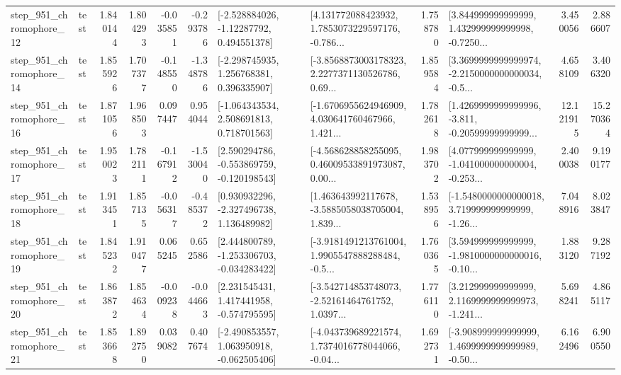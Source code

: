 \begin{tabular}{llrrrrllrlrr}
  step\_951\_chromophore\_12 &      test &      1.840144 &    1.804293 &     -0.035851 & -0.293786 &    [-2.528884026, -1.12287792, 0.494551378] &  [4.131772088423932, 1.7853073229597176, -0.786... &       1.758780 &  [3.844999999999999, 1.432999999999998, -0.7250... &            3.450056 &          2.886607 \\
  step\_951\_chromophore\_14 &      test &      1.855926 &    1.707377 &     -0.148550 & -1.348786 &    [-2.298745935, 1.256768381, 0.396335907] &  [-3.8568873003178323, 2.2277371130526786, 0.69... &       1.859584 &  [3.3699999999999974, -2.2150000000000034, -0.5... &            4.658109 &          3.406320 \\
  step\_951\_chromophore\_16 &      test &      1.871056 &    1.968503 &      0.097447 &  0.954044 &    [-1.064343534, 2.508691813, 0.718701563] &  [-1.6706955624946909, 4.030641760467966, 1.421... &       1.782618 &  [1.4269999999999996, -3.811, -0.20599999999999... &           12.121915 &         15.270364 \\
  step\_951\_chromophore\_17 &      test &      1.950023 &    1.782111 &     -0.167912 & -1.530040 &   [2.590294786, -0.553869759, -0.120198543] &  [-4.568628858255095, 0.46009533891973087, 0.00... &       1.983702 &  [4.077999999999999, -1.041000000000004, -0.253... &            2.400038 &          9.190177 \\
  step\_951\_chromophore\_18 &      test &      1.913451 &    1.857135 &     -0.056317 & -0.485372 &    [0.930932296, -2.327496738, 1.136489982] &  [1.463643992117678, -3.5885058038705004, 1.839... &       1.538956 &  [-1.5480000000000018, 3.719999999999999, -1.26... &            7.048916 &          8.023847 \\
  step\_951\_chromophore\_19 &      test &      1.845232 &    1.910477 &      0.065245 &  0.652586 &   [2.444800789, -1.253306703, -0.034283422] &  [-3.9181491213761004, 1.9905547888288484, -0.5... &       1.760365 &  [3.594999999999999, -1.9810000000000016, -0.10... &            1.883120 &          9.287192 \\
  step\_951\_chromophore\_20 &      test &      1.863872 &    1.854634 &     -0.009238 & -0.044663 &    [2.231545431, 1.417441958, -0.574795595] &  [-3.542714853748073, -2.52161464761752, 1.0397... &       1.776110 &  [3.212999999999999, 2.1169999999999973, -1.241... &            5.698241 &          4.865117 \\
  step\_951\_chromophore\_21 &      test &      1.853668 &    1.892750 &      0.039082 &  0.407674 &   [-2.490853557, 1.063950918, -0.062505406] &  [-4.043739689221574, 1.7374016778044066, -0.04... &       1.692731 &  [-3.908999999999999, 1.4699999999999989, -0.50... &            6.162496 &          6.900550 \\

\end{tabular}
